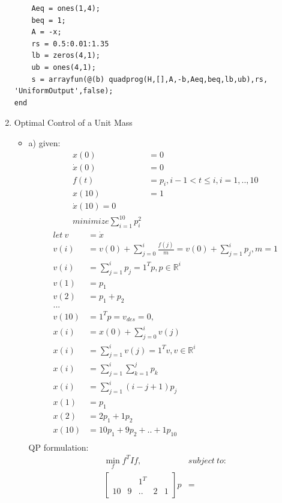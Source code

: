 \documentclass[12pt,letter]{article}
\newcommand{\R}{\mathbb{R}}
\begin{document}
\begin{enumerate}
\begin{verbatim}
    Aeq = ones(1,4);
    beq = 1;
    A = -x;
    rs = 0.5:0.01:1.35
    lb = zeros(4,1);
    ub = ones(4,1);
    s = arrayfun(@(b) quadprog(H,[],A,-b,Aeq,beq,lb,ub),rs, 'UniformOutput',false); 
end
\end{verbatim}
  
  \pagebreak
  
\item Optimal Control of a Unit Mass
  \begin{itemize}
  \item a) given:
    \begin{align*}
      x(0)&=0\\
      \dot{x}(0)&=0\\
      f(t)&=p_i, i-1 < t \leq i, i=1,..,10\\
      x(10)&=1\\
      \dot{x}(10)=0\\
      minimize \sum_{i=1}^{10} p_i^2
    \end{align*}
    \begin{align*}
      let\ v &= \dot{x}\\ 
      v(i) &= v(0) + \sum_{j=0}^i \frac{f(j)}{m} = v(0) + \sum_{j=1}^i p_j, m=1\\
      v(i) &= \sum_{j=1}^i p_j = 1^T p, p \in \R^{i}\\
      v(1) &= p_1\\
      v(2) &= p_1 + p_2\\
      ...\\
      v(10) &= 1^T p = v_{des} = 0,\\
      x(i) &= x(0) + \sum_{j=0}^i v(j)\\
      x(i) &= \sum_{j=1}^i v(j) = 1^T v, v \in \R^{i}\\
      x(i) &= \sum_{j=1}^i \sum_{k=1}^j p_k\\
      x(i) &= \sum_{j=1}^i (i-j+1) p_j\\
      x(1) &= p_1\\
      x(2) &= 2 p_1 + 1p_2\\
      x(10) &= 10 p_1 + 9p_2 + .. + 1p_{10}\\
    \end{align*}
    QP formulation:
    \begin{align*}
      \min_{f} f^TIf,\ &subject\ to:\\
      \begin{bmatrix}
        & & 1^T & & \\
        10 & 9 & .. & 2 & 1
      \end{bmatrix} p &=

\end{align*}
\end{itemize}
\end{enumerate}
\end{document}
